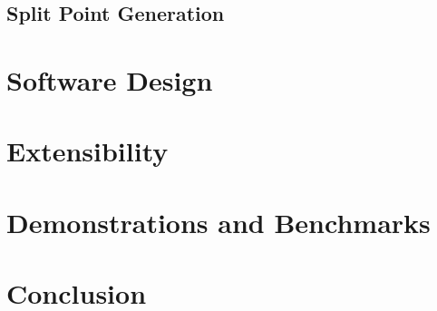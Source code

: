 \documentclass[a4paper, 11pt]{article}
\begin{document}
\subsection{Split Point Generation}




\section{Software Design}

\section{Extensibility}

\section{Demonstrations and Benchmarks}

\section{Conclusion}


\end{document}
